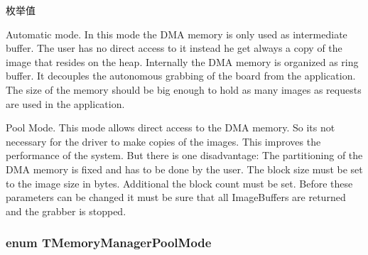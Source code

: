 \begin{Desc}
\item[枚举值]\par
\begin{description}
\item[{\em 
\hypertarget{group___common_interface_gga36f8c9739d1454dc75f980421ce5a6b6acc2727e46416f3ae80ba37874265a915}{mmm\+Auto}\label{group___common_interface_gga36f8c9739d1454dc75f980421ce5a6b6acc2727e46416f3ae80ba37874265a915}
}]Automatic mode. In this mode the D\+M\+A memory is only used as intermediate buffer. The user has no direct access to it instead he get always a copy of the image that resides on the heap. Internally the D\+M\+A memory is organized as ring buffer. It decouples the autonomous grabbing of the board from the application. The size of the memory should be big enough to hold as many images as requests are used in the application. \item[{\em 
\hypertarget{group___common_interface_gga36f8c9739d1454dc75f980421ce5a6b6a7d1820e3212d9d8e9a879a63a24836a2}{mmm\+Pool}\label{group___common_interface_gga36f8c9739d1454dc75f980421ce5a6b6a7d1820e3212d9d8e9a879a63a24836a2}
}]Pool Mode. This mode allows direct access to the D\+M\+A memory. So its not necessary for the driver to make copies of the images. This improves the performance of the system. But there is one disadvantage\+: The partitioning of the D\+M\+A memory is fixed and has to be done by the user. The block size must be set to the image size in bytes. Additional the block count must be set. Before these parameters can be changed it must be sure that all Image\+Buffers are returned and the grabber is stopped. \end{description}
\end{Desc}
\hypertarget{group___common_interface_ga01e39bfd4e5f1b4427bc403985f53835}{
\subsubsection[{T\+Memory\+Manager\+Pool\+Mode}]{\setlength{\rightskip}{0pt plus 5cm}enum {\bf T\+Memory\+Manager\+Pool\+Mode}}}\label{group___common_interface_ga01e39bfd4e5f1b4427bc403985f53835}



